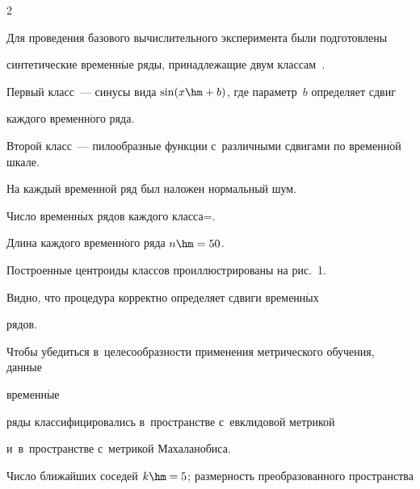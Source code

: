 \begin{multicols}{2}
\begin{figure}
\end{figure}


















Для проведения базового вычислительного эксперимента были подготовлены 


синтетические временн$\acute{\mbox{ы}}$е ряды, принадлежащие двум классам~\cite{Isachenko2015code}.





Первый класс~--- синусы вида $\sin(x \hm+ b)$, где параметр~$b$ определяет сдвиг 


каждого временн$\acute{\mbox{о}}$го ряда.





Второй класс~--- пилообразные функции с~различными сдвигами по временн$\acute{\mbox{о}}$й шкале.


На каж\-дый временной ряд был наложен нормальный шум.


Число временн$\acute{\mbox{ы}}$х рядов каждого клас\-са\;=.


Длина каждого временн$\acute{\mbox{о}}$го ряда $n \hm= 50$.


%


Построенные центроиды классов проиллюстрированы на рис.~1.


Видно, что процедура корректно определяет сдвиги временн$\acute{\mbox{ы}}$х 


рядов.








Чтобы убедиться в~целесообразности применения метрического обучения, данные


временн$\acute{\mbox{ы}}$е\linebreak


 ряды классифицировались в~пространстве с~евклидовой метрикой 


и~в~пространстве с~мет\-ри\-кой Махаланобиса.


Число ближайших соседей $k \hm= 5$; размерность преобразованного пространства 



\end{multicols}
